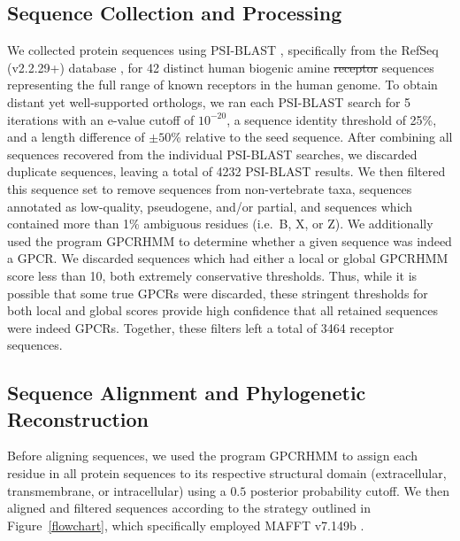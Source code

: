 \documentclass[fleqn,10pt]{wlpeerj}
\providecommand{\DIFaddtex}[1]{{\protect\color{blue}\uwave{#1}}} %
\providecommand{\DIFdeltex}[1]{{\protect\color{red}\sout{#1}}}                      %
\providecommand{\DIFaddbegin}{} %
\providecommand{\DIFaddend}{} %
\providecommand{\DIFdelbegin}{} %
\providecommand{\DIFdelend}{} %
\providecommand{\DIFadd}[1]{\texorpdfstring{\DIFaddtex{#1}}{#1}} %
\providecommand{\DIFdel}[1]{\texorpdfstring{\DIFdeltex{#1}}{}} %
\begin{document}
\subsection*{Sequence Collection and Processing}
We collected protein sequences using PSI-BLAST \citep{psiblast}, specifically from the RefSeq (v2.2.29+) database \citep{refseq}, for 42 distinct human biogenic amine \DIFdelbegin \DIFdel{receptor }\DIFdelend \DIFaddbegin \DIFadd{protein }\DIFaddend sequences representing the full range of known \DIFaddbegin \DIFadd{such }\DIFaddend receptors in the human genome. To obtain distant yet well-supported orthologs, we ran each PSI-BLAST search for 5 iterations with an e-value cutoff of $10^{-20}$, a sequence identity threshold of 25\%, and a length difference of $\pm50$\% relative to the seed sequence. After combining all sequences recovered from the individual PSI-BLAST searches, we discarded duplicate sequences, leaving a total of 4232 PSI-BLAST results. We then filtered this sequence set to remove sequences from non-vertebrate taxa, sequences annotated as low-quality, pseudogene, and/or partial, and sequences which contained more than 1\% ambiguous residues (i.e.\ B, X, or Z). We additionally used the program GPCRHMM \citep{Wistrand2006} to determine whether a given sequence was indeed a GPCR. We discarded sequences which had either a local or global GPCRHMM score less than 10, both extremely conservative thresholds. Thus, while it is possible that some true GPCRs were discarded, these stringent thresholds for both local and global scores provide high confidence that all retained sequences were indeed GPCRs. Together, these filters left a total of 3464 receptor sequences.


\subsection*{Sequence Alignment and Phylogenetic Reconstruction}
Before aligning sequences, we used the program GPCRHMM \citep{Wistrand2006} to assign each residue in all protein sequences to its respective structural domain (extracellular, transmembrane, or intracellular) using a $0.5$ posterior probability cutoff. We then aligned and filtered sequences according to the strategy outlined in Figure~\ref{flowchart}, which specifically employed MAFFT v7.149b \DIFaddbegin \DIFadd{using the default algorithm }\DIFaddend \citep{mafftv7}. 
\end{document}

